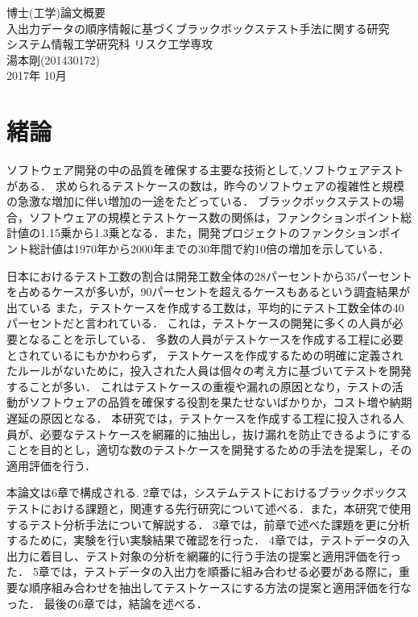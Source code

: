 \documentclass[10pt,a4j]{jarticle}
\begin{document}
\thispagestyle{empty}
\vspace*{2cm}
\begin{center}
\LARGE
博士(工学)論文概要\\[2cm]
入出力データの順序情報に基づくブラックボックステスト手法に関する研究\\[8cm]
システム情報工学研究科 リスク工学専攻\\[1cm]
湯本剛(201430172) \\[2cm]
2017年 10月
\end{center}

\clearpage
\tableofcontents

\pagebreak \setcounter{page}{1}

\section{緒論} \label{chap:1}
ソフトウェア開発の中の品質を確保する主要な技術として,ソフトウェアテストがある．
求められるテストケースの数は，昨今のソフトウェアの複雑性と規模の急激な増加に伴い増加の一途をたどっている．
ブラックボックステストの場合，ソフトウェアの規模とテストケース数の関係は，ファンクションポイント総計値の1.15乗から1.3乗となる\cite{jones1998estimating}．また，開発プロジェクトのファンクションポイント総計値は1970年から2000年までの30年間で約10倍の増加を示している\cite{longstreet2000}．

日本におけるテスト工数の割合は開発工数全体の28パーセントから35パーセントを占めるケースが多いが，90パーセントを超えるケースもあるという調査結果が出ている\cite{IPA2015}
また，テストケースを作成する工数は，平均的にテスト工数全体の40パーセントだと言われている\cite{van2013tpi}．
これは，テストケースの開発に多くの人員が必要となることを示している．
多数の人員がテストケースを作成する工程に必要とされているにもかかわらず， テストケースを作成するための明確に定義されたルールがないために，投入された人員は個々の考え方に基づいてテストを開発することが多い．
これはテストケースの重複や漏れの原因となり，テストの活動がソフトウェアの品質を確保する役割を果たせないばかりか，コスト増や納期遅延の原因となる．
本研究では，テストケースを作成する工程に投入される人員が、必要なテストケースを網羅的に抽出し，抜け漏れを防止できるようにすることを目的とし，適切な数のテストケースを開発するための手法を提案し，その適用評価を行う．

本論文は6章で構成される.
2章では，システムテストにおけるブラックボックステストにおける課題と，関連する先行研究について述べる．また，本研究で使用するテスト分析手法について解説する．
3章では，前章で述べた課題を更に分析するために，実験を行い実験結果で確認を行った．
4章では，テストデータの入出力に着目し、テスト対象の分析を網羅的に行う手法の提案と適用評価を行った．
5章では，テストデータの入出力を順番に組み合わせる必要がある際に，重要な順序組み合わせを抽出してテストケースにする方法の提案と適用評価を行なった．
最後の6章では，結論を述べる．
\end{document}
